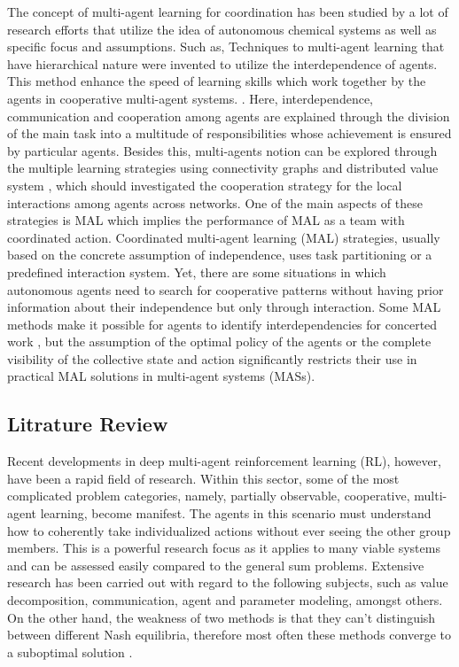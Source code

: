 \documentclass[11pt]{article}
\begin{document}
The concept of multi-agent learning for coordination has been studied by a lot of research efforts that utilize the idea of autonomous chemical systems as well as specific focus and assumptions. Such as, Techniques to multi-agent learning that have hierarchical nature were invented to utilize the interdependence of agents. This method enhance the speed of learning skills which work together by the agents in cooperative multi-agent systems. \cite{barto2003recent}. 
Here, interdependence, communication and cooperation among agents are explained through the division of the main task into a multitude of responsibilities whose achievement is ensured by particular agents. Besides this, multi-agents notion can be explored through the multiple learning strategies using connectivity graphs \cite{kok2005utile} and distributed value system \cite{nedic2009distributed}, which should investigated the cooperation strategy for the local interactions among agents across networks. One of the main aspects of these strategies is MAL which implies the performance of MAL as a team with coordinated action.
Coordinated multi-agent learning (MAL) strategies, usually based on the concrete assumption of independence, uses task partitioning or a predefined interaction system. Yet, there are some situations in which autonomous agents need to search for cooperative patterns without having prior information about their independence but only through interaction. Some MAL methods make it possible for agents to identify interdependencies for concerted work \cite{kok2004sparse}, but the assumption of the optimal policy of the agents or the complete visibility of the collective state and action significantly restricts their use in practical MAL solutions in multi-agent systems (MASs).






\subsection{Litrature Review}
Recent developments in deep multi-agent reinforcement learning (RL), however, have been a rapid field of research. Within this sector, some of the most complicated problem categories, namely, partially observable, cooperative, multi-agent learning, become manifest. The agents in this scenario must understand how to coherently take individualized actions without ever seeing the other group members. This is a powerful research focus as it applies to many viable systems and can be assessed easily compared to the general sum problems. Extensive research has been carried out with regard to the following subjects, such as value decomposition\cite{rashid2020monotonic}, communication, agent and parameter modeling, amongst others. On the other hand, the weakness of two methods is that they can't distinguish between different Nash equilibria, therefore most often these methods converge to a suboptimal solution \cite{christianos2020shared}.
\end{document}
